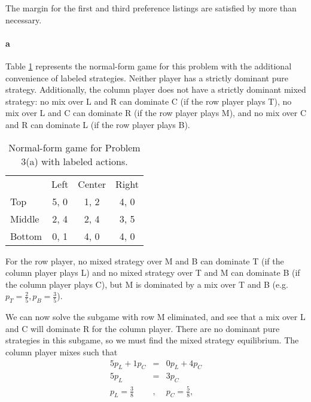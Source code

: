 The margin for the first and third preference listings are satisfied by more than necessary.

\begin{answer}{2}




\end{answer}


\begin{answer}{3}

\paragraph{a}
Table \ref{tab:3a} represents the normal-form game for this problem with the additional convenience of labeled strategies. Neither player has a strictly dominant pure strategy. Additionally, the column player does not have a strictly dominant mixed strategy: no mix over L and R can dominate C (if the row player plays T), no mix over L and C can dominate R (if the row player plays M), and no mix over C and R can dominate L (if the row player plays B). 

\begin{table}[h!]
\begin{center}
\begin{tabular}{l|c|c|c|}
\multicolumn{1}{c}{} & \multicolumn{1}{c}{Left} & \multicolumn{1}{c}{Center} & \multicolumn{1}{c}{Right} \\
\cline{2-4}
Top    & 5, 0 & 1, 2 & 4, 0 \\
\cline{2-4}
Middle & 2, 4 & 2, 4 & 3, 5 \\
\cline{2-4}
Bottom & 0, 1 & 4, 0 & 4, 0 \\
\cline{2-4}
\end{tabular}
\caption{Normal-form game for Problem 3(a) with labeled actions.}
\label{tab:3a}
\end{center}
\end{table}

For the row player, no mixed strategy over M and B can dominate T (if the column player plays L) and no mixed strategy over T and M can dominate B (if the column player plays C), but M is dominated by a mix over T and B (e.g. $p_T=\frac{2}{5}, p_B=\frac{3}{5}$).

We can now solve the subgame with row M eliminated, and see that a mix over L and C will dominate R for the column player. There are no dominant pure strategies in this subgame, so we must find the mixed strategy equilibrium. The column player mixes such that
\begin{eqnarray*}
5 p_L + 1 p_C &=& 0 p_L + 4 p_C \\
5 p_L &=& 3 p_C \\
p_L = \frac{3}{8} &,& p_C = \frac{5}{8},
\end{eqnarray*}


\end{answer}
